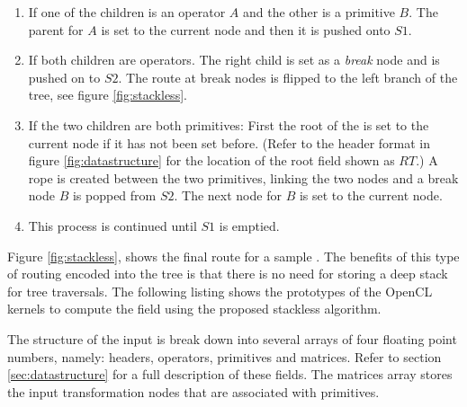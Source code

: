 \begin{enumerate}
 \item If one of the children is an operator $A$ and the other is a primitive $B$. The parent for $A$ is set 
 to the current node and then it is pushed onto $S1$.
 
 \item If both children are operators. The right child is set as a \textit{break} node and is pushed on to $S2$. 
 The route at break nodes is flipped to the left branch of the tree, see figure \ref{fig:stackless}. 
 
 \item If the two children are both primitives: First the root of the \blob is set to the current node if it has not been set before.
  (Refer to the \blob header format in figure \ref{fig:datastructure} for the location of the root field shown as $RT$.) 
  A rope is created between the two primitives, linking the two nodes and a break node $B$ is popped from $S2$. 
  The next node for $B$ is set to the current node.
 
  
 \item This process is continued until $S1$ is emptied.
\end{enumerate}




Figure \ref{fig:stackless}, shows the final route for a sample \blob. The benefits of this type of routing encoded into the tree
is that there is no need for storing a deep stack for tree traversals. The following listing shows the prototypes of the OpenCL 
kernels to compute the field using the proposed stackless algorithm.

The structure of the input \blob is break down into several arrays of four floating point numbers, namely: headers, operators, 
primitives and matrices. Refer to section \ref{sec:datastructure} for a full description of these fields. The matrices array 
stores the input transformation nodes that are associated with primitives.

